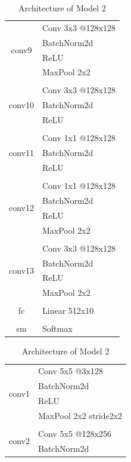 \documentclass{article}
\begin{document}
\begin{table}[htbp]
\begin{minipage}[t]{0.48\textwidth}
\begin{tabular}{c|l}
    \multirow{4}[0]{*}{conv9} & Conv 3x3 @128x128 \\
          & BatchNorm2d \\
          & ReLU  \\
          & MaxPool 2x2 \\\hline \\ [-1.5ex]
    \multirow{3}[0]{*}{conv10} & Conv 3x3 @128x128 \\
          & BatchNorm2d \\
          & ReLU  \\\hline \\ [-1.5ex]
    \multirow{3}[0]{*}{conv11} & Conv 1x1 @128x128 \\
          & BatchNorm2d \\
          & ReLU  \\\hline \\ [-1.5ex]
    \multirow{4}[0]{*}{conv12} & Conv 1x1 @128x128 \\
          & BatchNorm2d \\
          & ReLU  \\
          & MaxPool 2x2 \\\hline \\ [-1.5ex]
    \multirow{4}[0]{*}{conv13} & Conv 3x3 @128x128 \\
          & BatchNorm2d \\
          & ReLU  \\
          & MaxPool 2x2 \\\hline \\ [-1.5ex]
    fc    & Linear 512x10 \\\hline \\ [-1.5ex]
    sm    & Softmax \\
    \end{tabular}%
  \label{tab:1}%
\end{minipage}
\hfill
\begin{minipage}[t]{0.48\textwidth}
  \centering
  \caption{Architecture of Model 2}
    \begin{tabular}{c|l}
    \multirow{4}[0]{*}{conv1} & Conv 5x5 @3x128 \\
          & BatchNorm2d \\
          & ReLU  \\
          & MaxPool 2x2 stride2x2 \\
          \hline \\ [-1.5ex]
    \multirow{4}[0]{*}{conv2} & Conv 5x5 @128x256 \\
          & BatchNorm2d \\

\end{tabular}
\end{minipage}
\end{table}
\end{document}
